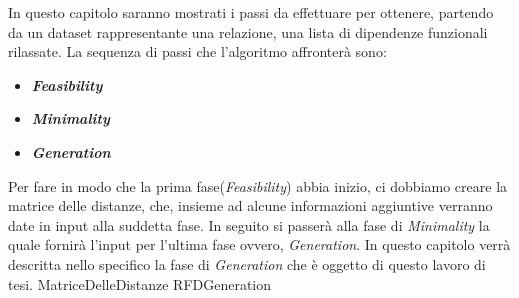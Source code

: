 In questo capitolo saranno mostrati i passi da effettuare per ottenere, partendo da un dataset rappresentante una relazione, una lista di dipendenze funzionali rilassate.
La sequenza di passi che l'algoritmo affronterà sono:
\begin{itemize}
	\item \textbf{\emph{Feasibility}}
	\item \textbf{\emph{Minimality}}
	\item \textbf{\emph{Generation}}
\end{itemize}
Per fare in modo che la prima fase(\emph{Feasibility}) abbia inizio, ci dobbiamo creare la matrice delle distanze, che, insieme ad alcune informazioni aggiuntive verranno date in input alla suddetta fase.
In seguito si passerà alla fase di \textit{Minimality} la quale fornirà l'input per l'ultima fase ovvero, \textit{Generation}. In questo capitolo verrà descritta nello specifico la fase di \textit{Generation} che è oggetto di questo lavoro di tesi.
{MatriceDelleDistanze}
{RFDGeneration}